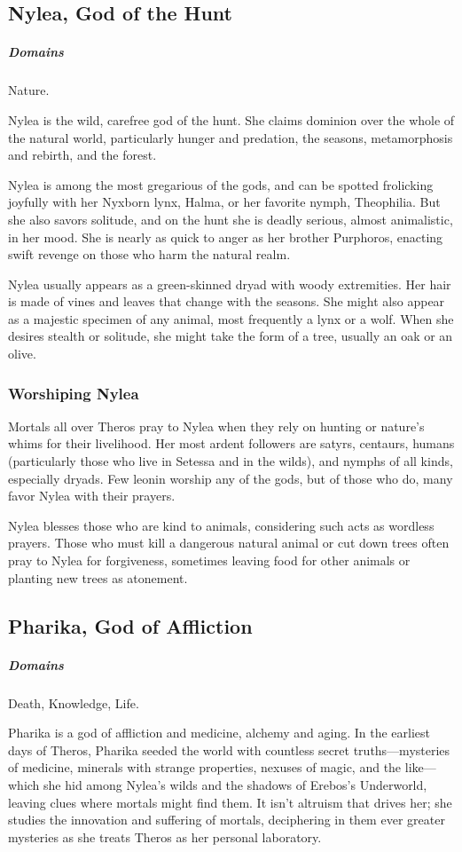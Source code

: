 \subsection*{Nylea, God of the Hunt} \label{ssec::nylea}
    \subparagraph{Domains} Nature.

    Nylea is the wild, carefree god of the hunt. She claims dominion over the whole of the natural world, particularly hunger and predation, the seasons, metamorphosis and rebirth, and the forest.

    Nylea is among the most gregarious of the gods, and can be spotted frolicking joyfully with her Nyxborn lynx, Halma, or her favorite nymph, Theophilia. But she also savors solitude, and on the hunt she is deadly serious, almost animalistic, in her mood. She is nearly as quick to anger as her brother Purphoros, enacting swift revenge on those who harm the natural realm.

    Nylea usually appears as a green-skinned dryad with woody extremities. Her hair is made of vines and leaves that change with the seasons. She might also appear as a majestic specimen of any animal, most frequently a lynx or a wolf. When she desires stealth or solitude, she might take the form of a tree, usually an oak or an olive.

    \subsubsection{Worshiping Nylea}
        Mortals all over Theros pray to Nylea when they rely on hunting or nature's whims for their livelihood. Her most ardent followers are satyrs, centaurs, humans (particularly those who live in Setessa and in the wilds), and nymphs of all kinds, especially dryads. Few leonin worship any of the gods, but of those who do, many favor Nylea with their prayers.

        Nylea blesses those who are kind to animals, considering such acts as wordless prayers. Those who must kill a dangerous natural animal or cut down trees often pray to Nylea for forgiveness, sometimes leaving food for other animals or planting new trees as atonement.

\subsection*{Pharika, God of Affliction} \label{ssec::pharika}
    \subparagraph{Domains} Death, Knowledge, Life.

    Pharika is a god of affliction and medicine, alchemy and aging. In the earliest days of Theros, Pharika seeded the world with countless secret truths—mysteries of medicine, minerals with strange properties, nexuses of magic, and the like—which she hid among Nylea's wilds and the shadows of Erebos's Underworld, leaving clues where mortals might find them. It isn't altruism that drives her; she studies the innovation and suffering of mortals, deciphering in them ever greater mysteries as she treats Theros as her personal laboratory.

